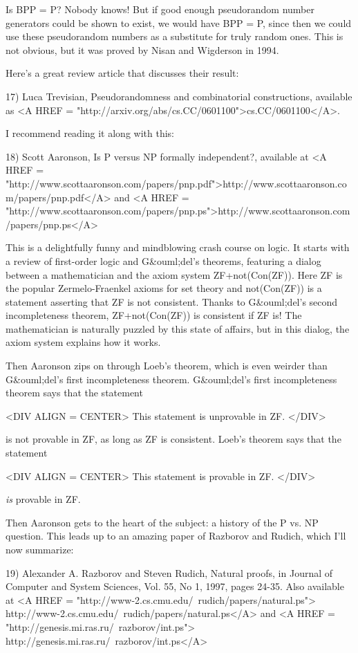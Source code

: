 Is BPP = P?  Nobody knows!  But if good enough pseudorandom number
generators could be shown to exist, we would have BPP = P, since then we
could use these pseudorandom numbers as a substitute for truly random ones.  
This is not obvious, but it was proved by Nisan and Wigderson in 1994.

Here's a great review article that discusses their result:

17) Luca Trevisian, Pseudorandomness and combinatorial constructions,
available as <A HREF = "http://arxiv.org/abs/cs.CC/0601100">cs.CC/0601100</A>.

I recommend reading it along with this:

18) Scott Aaronson, Is P versus NP formally independent?, available
at <A HREF = "http://www.scottaaronson.com/papers/pnp.pdf">http://www.scottaaronson.com/papers/pnp.pdf</A> and
<A HREF = "http://www.scottaaronson.com/papers/pnp.ps">http://www.scottaaronson.com/papers/pnp.ps</A> 

This is a delightfully funny and mindblowing crash course on logic. 
It starts with a review of first-order logic and G&ouml;del's theorems,
featuring a dialog between a mathematician and the axiom system
ZF+not(Con(ZF)).   Here ZF is the popular Zermelo-Fraenkel axioms 
for set theory and not(Con(ZF)) is a statement asserting that ZF
is not consistent.  Thanks to G&ouml;del's second incompleteness theorem,
ZF+not(Con(ZF)) is consistent if ZF is!  The mathematician is naturally
puzzled by this state of affairs, but in this dialog, the axiom system
explains how it works.

Then Aaronson zips on through Loeb's theorem, which is even weirder than 
G&ouml;del's first incompleteness theorem.  G&ouml;del's first incompleteness
theorem says that the statement 

<DIV ALIGN = CENTER>
This statement is unprovable in ZF.
</DIV>

is not provable in ZF, as long as ZF is consistent.  Loeb's theorem says that 
the statement 

<DIV ALIGN = CENTER>
This statement is provable in ZF.
</DIV>

\emph{is} provable in ZF.  

Then Aaronson gets to the heart of the subject: a history of the P vs. NP 
question.  This leads up to an amazing paper of Razborov and Rudich, 
which I'll now summarize:

19) Alexander A. Razborov and Steven Rudich, Natural proofs, in
Journal of Computer and System Sciences, Vol. 55, No 1, 1997, pages 24-35.
Also available at 
<A HREF = "http://www-2.cs.cmu.edu/~rudich/papers/natural.ps">
http://www-2.cs.cmu.edu/~rudich/papers/natural.ps</A> 
and
<A HREF = "http://genesis.mi.ras.ru/~razborov/int.ps">
http://genesis.mi.ras.ru/~razborov/int.ps</A>


